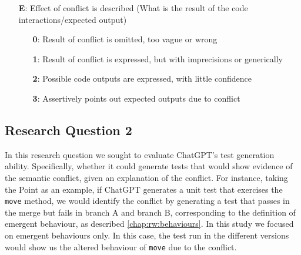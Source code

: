 \begin{itemize}
  \item[\textbf{E}:] Effect of conflict is described (What is the result of the code interactions/expected output)
  \begin{itemize}
    \item[\textbf{0}:] Result of conflict is omitted, too vague or wrong
    \item[\textbf{1}:] Result of conflict is expressed, but with imprecisions or generically
    \item[\textbf{2}:] Possible code outputs are expressed, with little confidence
    \item[\textbf{3}:] Assertively points out expected outputs due to conflict
  \end{itemize}
\end{itemize}


\subsection{Research Question 2}

In this research question we sought to evaluate ChatGPT's test generation ability. Specifically, whether it could generate tests that would show evidence of the semantic conflict, given an explanation of the conflict.
For instance, taking the Point as an example, if ChatGPT generates a unit test that exercises the \texttt{move} method, we would identify the conflict by generating a test that passes in the merge but fails in branch A and branch B, corresponding to the definition of emergent behaviour,
as described \ref{chap:rw:behaviours}. In this study we focused on emergent behaviours only.
In this case, the test run in the different versions would show us the altered behaviour of \texttt{move} due to the conflict.


